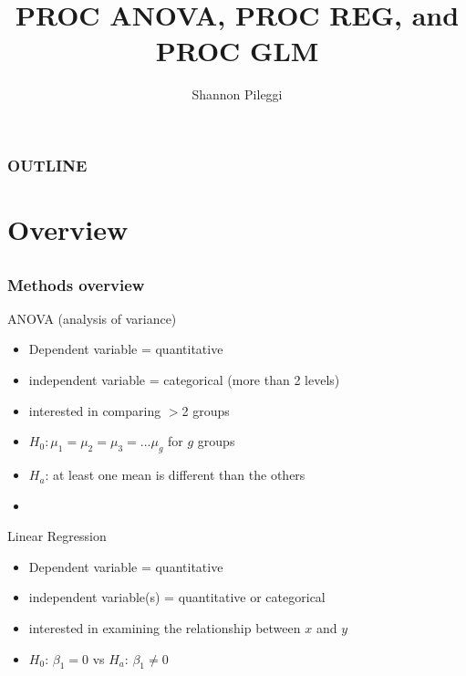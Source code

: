



\title[Lecture 13]{PROC ANOVA, PROC REG, and PROC GLM}
\author[Pileggi]{Shannon Pileggi}


\date{}




\begin{frame}
\titlepage
\end{frame}

\begin{frame}
\frametitle{OUTLINE\qquad\qquad\qquad} \tableofcontents[hideallsubsections]
\end{frame}

\section[Overview]{Overview}
\subsection{}

\begin{frame}
\frametitle{Methods overview}
ANOVA (analysis of variance)
\begin{itemize}
    \item
    Dependent variable = quantitative
    \item[] independent variable = categorical (more than 2 levels)
    \item
    interested in comparing $>$2 groups
    \item[]
    $H_0: \mu_1=\mu_2=\mu_3=\ldots \mu_g$ for $g$ groups
    \item[]
    $H_a$: at least one mean is different than the others
    \item[]
\end{itemize}

Linear Regression
\begin{itemize}
    \item
    Dependent variable = quantitative
    \item[] independent variable(s) = quantitative or categorical
    \item
    interested in examining the relationship between $x$ and $y$
    \item[]
    $H_0$: $\beta_1=0$ vs  $H_a$: $\beta_1 \neq 0$
\end{itemize}
\end{frame}


